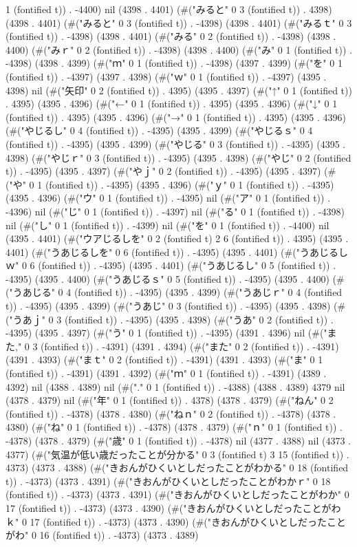 1 (fontified t)) . -4400) nil (4398 . 4401) (#("みると" 0 3 (fontified t)) . 4398) (4398 . 4401) (#("みると" 0 3 (fontified t)) . -4398) (4398 . 4401) (#("みるｔ" 0 3 (fontified t)) . -4398) (4398 . 4401) (#("みる" 0 2 (fontified t)) . -4398) (4398 . 4400) (#("みｒ" 0 2 (fontified t)) . -4398) (4398 . 4400) (#("み" 0 1 (fontified t)) . -4398) (4398 . 4399) (#("ｍ" 0 1 (fontified t)) . -4398) (4397 . 4399) (#("を" 0 1 (fontified t)) . -4397) (4397 . 4398) (#("ｗ" 0 1 (fontified t)) . -4397) (4395 . 4398) nil (#("矢印" 0 2 (fontified t)) . 4395) (4395 . 4397) (#("↑" 0 1 (fontified t)) . 4395) (4395 . 4396) (#("←" 0 1 (fontified t)) . 4395) (4395 . 4396) (#("↓" 0 1 (fontified t)) . 4395) (4395 . 4396) (#("→" 0 1 (fontified t)) . 4395) (4395 . 4396) (#("やじるし" 0 4 (fontified t)) . -4395) (4395 . 4399) (#("やじるｓ" 0 4 (fontified t)) . -4395) (4395 . 4399) (#("やじる" 0 3 (fontified t)) . -4395) (4395 . 4398) (#("やじｒ" 0 3 (fontified t)) . -4395) (4395 . 4398) (#("やじ" 0 2 (fontified t)) . -4395) (4395 . 4397) (#("やｊ" 0 2 (fontified t)) . -4395) (4395 . 4397) (#("や" 0 1 (fontified t)) . -4395) (4395 . 4396) (#("ｙ" 0 1 (fontified t)) . -4395) (4395 . 4396) (#("ウ" 0 1 (fontified t)) . -4395) nil (#("ア" 0 1 (fontified t)) . -4396) nil (#("じ" 0 1 (fontified t)) . -4397) nil (#("る" 0 1 (fontified t)) . -4398) nil (#("し" 0 1 (fontified t)) . -4399) nil (#("を" 0 1 (fontified t)) . -4400) nil (4395 . 4401) (#("ウアじるしを" 0 2 (fontified t) 2 6 (fontified t)) . 4395) (4395 . 4401) (#("うあじるしを" 0 6 (fontified t)) . -4395) (4395 . 4401) (#("うあじるしｗ" 0 6 (fontified t)) . -4395) (4395 . 4401) (#("うあじるし" 0 5 (fontified t)) . -4395) (4395 . 4400) (#("うあじるｓ" 0 5 (fontified t)) . -4395) (4395 . 4400) (#("うあじる" 0 4 (fontified t)) . -4395) (4395 . 4399) (#("うあじｒ" 0 4 (fontified t)) . -4395) (4395 . 4399) (#("うあじ" 0 3 (fontified t)) . -4395) (4395 . 4398) (#("うあｊ" 0 3 (fontified t)) . -4395) (4395 . 4398) (#("うあ" 0 2 (fontified t)) . -4395) (4395 . 4397) (#("う" 0 1 (fontified t)) . -4395) (4391 . 4396) nil (#("また," 0 3 (fontified t)) . -4391) (4391 . 4394) (#("また" 0 2 (fontified t)) . -4391) (4391 . 4393) (#("まｔ" 0 2 (fontified t)) . -4391) (4391 . 4393) (#("ま" 0 1 (fontified t)) . -4391) (4391 . 4392) (#("ｍ" 0 1 (fontified t)) . -4391) (4389 . 4392) nil (4388 . 4389) nil (#("." 0 1 (fontified t)) . -4388) (4388 . 4389) 4379 nil (4378 . 4379) nil (#("年" 0 1 (fontified t)) . 4378) (4378 . 4379) (#("ねん" 0 2 (fontified t)) . -4378) (4378 . 4380) (#("ねｎ" 0 2 (fontified t)) . -4378) (4378 . 4380) (#("ね" 0 1 (fontified t)) . -4378) (4378 . 4379) (#("ｎ" 0 1 (fontified t)) . -4378) (4378 . 4379) (#("歳" 0 1 (fontified t)) . -4378) nil (4377 . 4388) nil (4373 . 4377) (#("気温が低い歳だったことが分かる" 0 3 (fontified t) 3 15 (fontified t)) . 4373) (4373 . 4388) (#("きおんがひくいとしだったことがわかる" 0 18 (fontified t)) . -4373) (4373 . 4391) (#("きおんがひくいとしだったことがわかｒ" 0 18 (fontified t)) . -4373) (4373 . 4391) (#("きおんがひくいとしだったことがわか" 0 17 (fontified t)) . -4373) (4373 . 4390) (#("きおんがひくいとしだったことがわｋ" 0 17 (fontified t)) . -4373) (4373 . 4390) (#("きおんがひくいとしだったことがわ" 0 16 (fontified t)) . -4373) (4373 . 4389) 